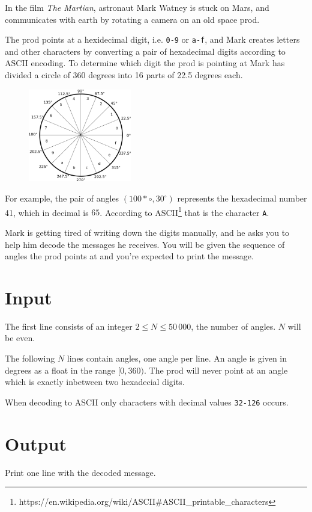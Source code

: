 
In the film \emph{The Martian}, astronaut Mark Watney is stuck on Mars, and communicates with earth by rotating a camera on an old space prod.

The prod points at a hexidecimal digit, i.e. \texttt{0-9} or \texttt{a-f}, and Mark creates letters and other characters by converting a pair
of hexadecimal digits according to ASCII encoding. To determine which digit the prod is pointing at Mark has divided a circle of 360 degrees into 16 parts of 22.5 degrees each.

\begin{figure}[h!]
  \begin{center}
    \includegraphics[width=0.4\textwidth]{angles.eps}
  \end{center}
\end{figure}

For example, the pair of angles $(100*{\circ}, 30^{\circ})$ represents the hexadecimal number 41, which in decimal is $65$.
According to ASCII\footnote{https://en.wikipedia.org/wiki/ASCII\#ASCII\_printable\_characters} that is the character \texttt{A}.

Mark is getting tired of writing down the digits manually, and he asks you to help him decode the messages he receives. You will be given the sequence of angles the prod points at and you're expected to print the message.
\section*{Input}
The first line consists of an integer $2 \le N \le 50\,000$, the number of angles. $N$ will be even.

The following $N$ lines contain angles, one angle per line. An angle is given in degrees as a float in the range $[0, 360)$.
The prod will never point at an angle which is exactly inbetween two hexadecial digits.

When decoding to ASCII only characters with decimal values \texttt{32-126} occurs.
\section*{Output}
Print one line with the decoded message.
